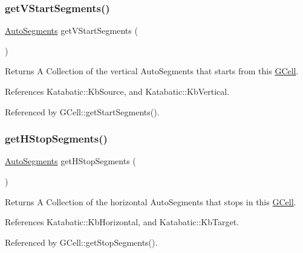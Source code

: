 \subsubsection{\texorpdfstring{get\+V\+Start\+Segments()}{getVStartSegments()}}
{\footnotesize\ttfamily \mbox{\hyperlink{namespaceKatabatic_a2221b0ddbc24f331809fc86f98e38041}{Auto\+Segments}} get\+V\+Start\+Segments (\begin{DoxyParamCaption}{ }\end{DoxyParamCaption})}

\begin{DoxyReturn}{Returns}
A Collection of the vertical Auto\+Segments that starts from this \mbox{\hyperlink{classKatabatic_1_1GCell}{G\+Cell}}. 
\end{DoxyReturn}


References Katabatic\+::\+Kb\+Source, and Katabatic\+::\+Kb\+Vertical.



Referenced by G\+Cell\+::get\+Start\+Segments().

\mbox{\label{classKatabatic_1_1GCell_a77beccf65527a330f15bed2aba4f9dea}} 
\subsubsection{\texorpdfstring{get\+H\+Stop\+Segments()}{getHStopSegments()}}
{\footnotesize\ttfamily \mbox{\hyperlink{namespaceKatabatic_a2221b0ddbc24f331809fc86f98e38041}{Auto\+Segments}} get\+H\+Stop\+Segments (\begin{DoxyParamCaption}{ }\end{DoxyParamCaption})}

\begin{DoxyReturn}{Returns}
A Collection of the horizontal Auto\+Segments that stops in this \mbox{\hyperlink{classKatabatic_1_1GCell}{G\+Cell}}. 
\end{DoxyReturn}


References Katabatic\+::\+Kb\+Horizontal, and Katabatic\+::\+Kb\+Target.



Referenced by G\+Cell\+::get\+Stop\+Segments().

\mbox{\label{classKatabatic_1_1GCell_a2f0f038f5700b7b55f22829c5d43aa07}} 
